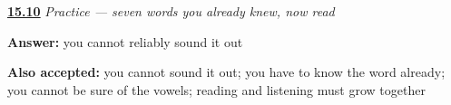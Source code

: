 \noindent\begin{minipage}[t]{\linewidth}
\raggedright
\hyperlink{review-FA-C15-practice-vowels}{\textbf{15.10}} \emph{Practice — seven words you already knew, now read}\par
\small \textbf{Answer:} you cannot reliably sound it out\par
\footnotesize \textbf{Also accepted:} you cannot sound it out; you have to know the word already; you cannot be sure of the vowels; reading and listening must grow together
\end{minipage}\par\medskip
